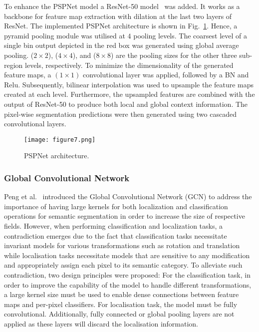 To enhance the PSPNet model a ResNet-50 model~\cite{He2016} was added. 
It works as a backbone for feature map extraction with dilation at the last two layers of ResNet. 
The implemented PSPNet architecture is shown in Fig.~\ref{fig:PSPNet}.
Hence, a pyramid pooling module was utilised at \(4\) pooling levels.
The coarsest level of a single bin output depicted in the red box was generated using global average pooling.
(\(2\times2\)), (\(4\times 4\)), and (\(8\times8\)) are the pooling sizes for the other three sub-region levels, respectively.
To minimize the dimensionality of the generated feature maps, a \((1\times 1)\) convolutional layer was applied, followed by a BN and Relu.
Subsequently, bilinear interpolation was used to upsample the feature maps created at each level.
Furthermore, the upsampled features are combined with the output of ResNet-50 to produce both local and global context information.
The pixel-wise segmentation predictions were then generated using two cascaded convolutional layers. 
\begin{figure} [h!]
	\centering
	\texttt{[image: figure7.png]}
	\caption{PSPNet architecture.} 
	\label{fig:PSPNet}
\end{figure} 
\subsubsection{Global Convolutional Network}
Peng et al.~\cite{Peng2017} introduced the Global Convolutional Network (GCN) to address the importance of having large kernels for both localization and classification operations for semantic segmentation in order to increase the size of respective fields.
However, when performing classification and localization tasks, a contradiction emerges due to the fact that classification tasks necessitate invariant models for various transformations such as rotation and translation while localisation tasks necessitate models that are sensitive to any modification and appropriately assign each pixel to its semantic category.
To alleviate such contradiction, two design principles were proposed:
For the classification task, in order to improve the capability of 
the model to handle different transformations, a large kernel size must be 
used to enable dense connections between feature maps and per-pixel 
classifiers.
For localisation task, the model must be fully convolutional. 
Additionally, fully connected or global pooling layers are not applied as 
these layers will discard the localisation information. 

